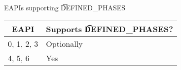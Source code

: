 
\begin{centertable}{EAPIs supporting \t{DEFINED_PHASES}}
    \label{tab:defined-phases-table}
    \begin{tabular}{ll}
      \toprule
      \multicolumn{1}{c}{\textbf{EAPI}} &
      \multicolumn{1}{c}{\textbf{Supports \t{DEFINED_PHASES}?}} \\
      \midrule
      0, 1, 2, 3        & Optionally \\
      4, 5, 6           & Yes        \\
      \bottomrule
    \end{tabular}
\end{centertable}


